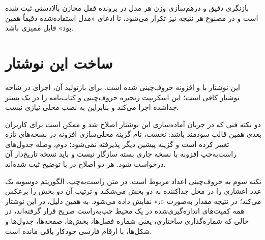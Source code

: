 بازنگری دقیق و درهم‌سازی وزن هر مدل در پرونده قفل مخازن بالادستی ثبت شده
است و در مصنوع هر نتیجه نیز تکرار می‌شود، تا ادعای «مدل استفاده‌شده دقیقاً
همین بود» قابل ممیزی باشد.

\section{ساخت این نوشتار}
\label{sec:appendix-build}

این نوشتار با  و افزونه  حروف‌چینی شده است. برای
بازتولید آن، اجرای  در شاخه نوشتار کافی است؛ این اسکریپت
زنجیره حروف‌چینی و کتاب‌نامه را در یک بستر جداشده اجرا می‌کند و بنابراین
به نصب محلی  نیازی نیست.

دو نکته فنی که در جریان آماده‌سازی این نوشتار اصلاح شد و ممکن است برای
کاربران بعدی همین قالب سودمند باشد: نخست، نام گزینه محلی‌سازی افزونه
 در نسخه‌های تازه تغییر کرده است و گزینه پیشین دیگر پذیرفته
نمی‌شود؛ دوم، وصله جدول‌های راست‌به‌چپ افزونه  با نسخه جاری بسته
 سازگار نیست و باید نسخه تاریخ‌دار آن درخواست شود. هر دو اصلاح در
 با توضیح ثبت شده‌اند.

نکته سوم به حروف‌چینی اعداد مربوط است. در متن راست‌به‌چپ، الگوریتم
دوسویه یک عدد اعشاری را در محل جداکننده به دو بخش می‌شکند و ترتیب آن دو
بخش را برعکس می‌کند؛ در نتیجه مقدار  به‌صورت
«٫» نمایش داده می‌شود. به همین دلیل، در این نوشتار همه
کمیت‌های اندازه‌گیری‌شده در یک محیط چپ‌به‌راست صریح قرار گرفته‌اند، در حالی
که شماره‌گذاری ساختاری، یعنی شماره فصل‌ها، بخش‌ها، صفحه‌ها، جدول‌ها و
شکل‌ها، با ارقام فارسی خودکار باقی مانده است.
